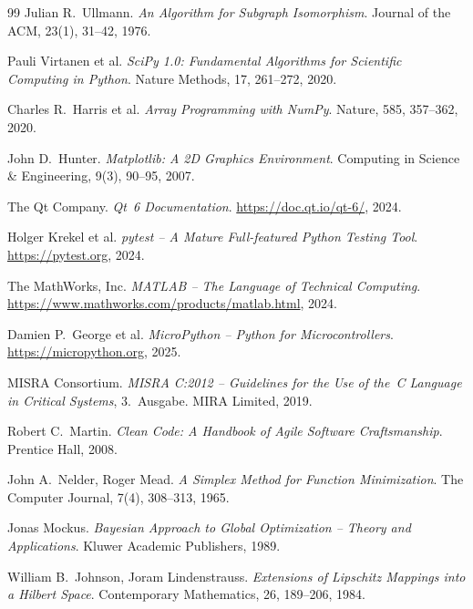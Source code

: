 \documentclass[a4paper,12pt]{article}
\theoremstyle{definition}
\begin{document}
\begin{thebibliography}{99}
Julian R.\ Ullmann.
\textit{An Algorithm for Subgraph Isomorphism}.
Journal of the ACM, 23(1), 31--42, 1976.

Pauli Virtanen et al.
\textit{SciPy 1.0: Fundamental Algorithms for Scientific Computing in Python}.
Nature Methods, 17, 261--272, 2020.

Charles R.\ Harris et al.
\textit{Array Programming with NumPy}.
Nature, 585, 357--362, 2020.

John D.\ Hunter.
\textit{Matplotlib: A 2D Graphics Environment}.
Computing in Science \& Engineering, 9(3), 90--95, 2007.

The Qt Company.
\textit{Qt~6 Documentation}.
\url{https://doc.qt.io/qt-6/}, 2024.

Holger Krekel et al.
\textit{pytest -- A Mature Full-featured Python Testing Tool}.
\url{https://pytest.org}, 2024.

The MathWorks, Inc.
\textit{MATLAB -- The Language of Technical Computing}.
\url{https://www.mathworks.com/products/matlab.html}, 2024.

Damien P.\ George et al.
\textit{MicroPython -- Python for Microcontrollers}.
\url{https://micropython.org}, 2025.

MISRA Consortium.
\textit{MISRA C:2012 -- Guidelines for the Use of the~C Language
in Critical Systems}, 3.\ Ausgabe.
MIRA Limited, 2019.

Robert C.\ Martin.
\textit{Clean Code: A Handbook of Agile Software Craftsmanship}.
Prentice Hall, 2008.

John A.\ Nelder, Roger Mead.
\textit{A Simplex Method for Function Minimization}.
The Computer Journal, 7(4), 308--313, 1965.

Jonas Mockus.
\textit{Bayesian Approach to Global Optimization -- Theory and Applications}.
Kluwer Academic Publishers, 1989.

William B.\ Johnson, Joram Lindenstrauss.
\textit{Extensions of Lipschitz Mappings into a Hilbert Space}.
Contemporary Mathematics, 26, 189--206, 1984.


\end{thebibliography}
\end{document}
